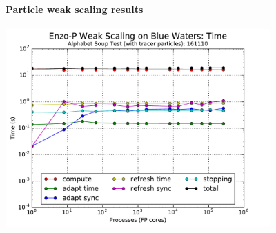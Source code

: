 \begin{frame}[fragile,label=ss-recent-particles] 
  \secframetitle{\ssRecentParticles}
  \framesubtitle{Particle weak scaling results}
\begin{center}
  \vspace{-0.1in}
  \begin{minipage}{4.50in}
    \begin{center}
      \begin{minipage}{4in}
    \includegraphics[width=4.0in]{scaling-time-161110.pdf}
    \end{minipage} \\
    \end{center}
  \end{minipage} \\
\end{center}
  
\end{frame}


